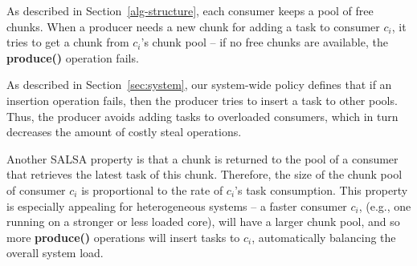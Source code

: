 As described in Section~\ref{alg-structure}, each consumer keeps a pool of free chunks.
When a producer needs a new chunk for adding a task to consumer $c_i$, it tries to get a chunk from $c_i$'s chunk pool -- if no free chunks are available, the {\bf produce()} operation fails.

As described in Section~\ref{sec:system}, our system-wide policy defines that if an insertion operation fails, then the producer tries to insert a task to other pools. Thus, the producer avoids adding tasks to overloaded consumers, which in turn decreases the amount of costly steal operations. 

Another SALSA property is that a chunk is returned to the pool of a consumer that retrieves the latest task of this chunk. 
Therefore, the size of the chunk pool of consumer $c_i$ is proportional to the rate of $c_i$'s task consumption.
This property is especially appealing for heterogeneous systems -- a faster consumer $c_i$, (e.g., one running on a stronger or less loaded core), will have a larger chunk pool, and so more {\bf produce()} operations will insert tasks to $c_i$, automatically balancing the overall system load. 
